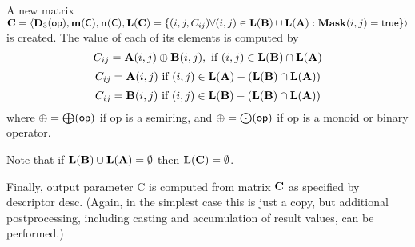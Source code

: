 A new matrix ${\bf C} = \langle \bold{D}_3({\sf op}),
\bold{m}({\bf \sf C}), \bold{n}({\bf \sf C}), \bold{L}({\bf C}) = \{(i,j,C_{ij})  \forall (i,j) \in
\bold{L}({\bf B}) \cup \bold{L}({\bf A}) : {\bf Mask}(i,j)
= {\sf true} \} \rangle$ is created.  The value of each of its
elements is computed by 
\[
C_{ij} = {\bf A}(i,j) \oplus {\bf B}(i,j), \ \mbox{if}\  (i,j) \in  \bold{L}({\bf B}) \cap \bold{L}({\bf A})
\]
\[
C_{ij} = {\bf A}(i,j) \ \mbox{if}\  (i,j) \in  \bold{L}({\bf A}) - (\bold{L}({\bf B}) \cap \bold{L}({\bf A}))
\]
\[
C_{ij} = {\bf B}(i,j) \ \mbox{if}\  (i,j) \in  \bold{L}({\bf B}) - (\bold{L}({\bf B}) \cap \bold{L}({\bf A}))
\]
where $\oplus = \bigoplus({\sf op})$ if {\sf op} is a semiring, and $\oplus = \bigodot({\sf op})$
if {\sf op} is a monoid or binary operator.

Note that if $\bold{L}({\bf B}) \cup \bold{L}({\bf A}) = \emptyset$
then $\bold{L}({\bf C}) = \emptyset$.

Finally, output parameter {\sf C} is computed from matrix ${\bf C}$
as specified by descriptor {\sf desc}. (Again, in the simplest case this
is just a copy, but additional postprocessing, including casting and
accumulation of result values, can be performed.) 

